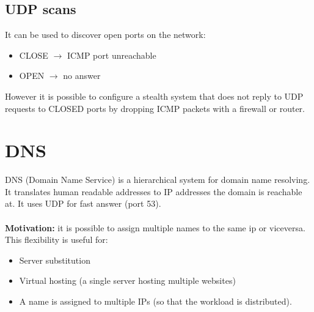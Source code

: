 \documentclass[10pt,a4paper]{book}
\begin{document}
\subsection{UDP scans}
It can be used to discover open ports on the network:
\begin{itemize}
\item CLOSE $\to$ ICMP port unreachable
\item OPEN $\to$ no answer
\end{itemize}
However it is possible to configure a stealth system that does not reply to UDP requests to CLOSED ports by dropping ICMP packets with a firewall or router.
\newpage
\section{DNS}
DNS (Domain Name Service) is a hierarchical system for domain name resolving. It translates human readable addresses to IP addresses the domain is reachable at. It uses UDP for fast answer (port 53).\\\\
\textbf{Motivation:} it is possible to assign multiple names to the same ip or viceversa. This flexibility is useful for:
\begin{itemize}%
\item Server substitution
\item Virtual hosting (a single server hosting multiple websites)
\item A name is assigned to multiple IPs (so that the workload is distributed).
\end{itemize}
\end{document}
